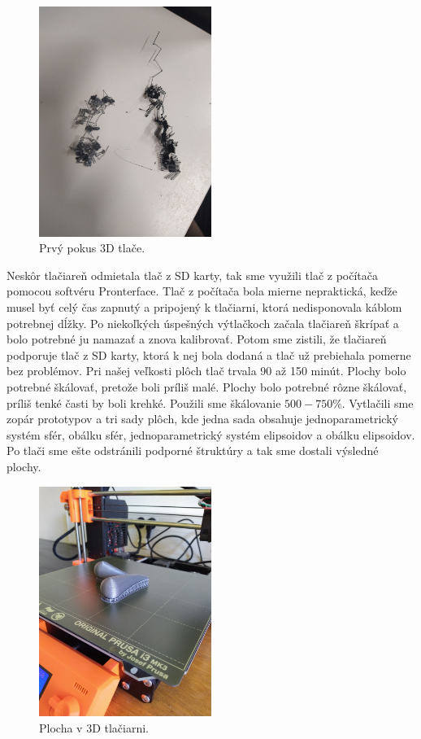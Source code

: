 \begin{figure}[h]
	\centering
	\includegraphics[width=0.5\textwidth]{images/tlac_prvy_pokus.jpg}
	\caption[Prvý pokus 3D tlače.]{Prvý pokus 3D tlače.}
	\label{fig:prvypokus}
\end{figure}

Neskôr tlačiareň odmietala tlač z SD karty, tak sme využili tlač z počítača pomocou softvéru Pronterface. Tlač z počítača bola mierne nepraktická, keďže musel byť celý čas zapnutý a pripojený k tlačiarni, ktorá nedisponovala káblom potrebnej dĺžky. Po niekoľkých úspešných výtlačkoch začala tlačiareň škrípať a bolo potrebné ju namazať a znova kalibrovať. Potom sme zistili, že tlačiareň podporuje tlač z SD karty, ktorá k nej bola dodaná a tlač už prebiehala pomerne bez problémov. Pri našej veľkosti plôch tlač trvala 90 až 150 minút. Plochy bolo potrebné škálovať, pretože boli príliš malé. Plochy bolo potrebné rôzne škálovať, príliš tenké časti by boli krehké. Použili sme škálovanie $500-750\%$. Vytlačili sme zopár prototypov a tri sady plôch, kde jedna sada obsahuje jednoparametrický systém sfér, obálku sfér, jednoparametrický systém elipsoidov a obálku elipsoidov. Po tlači sme ešte odstránili podporné štruktúry a tak sme dostali výsledné plochy. 

\begin{figure}[h]
	\centering	\includegraphics[angle=-90,width=0.5\textwidth]{images/plocha_v_tlaciarni.jpg}
	\caption[Plocha v 3D tlačiarni.]{Plocha v 3D tlačiarni.}
	\label{fig:plocha_v_tlaciarni}
\end{figure}

